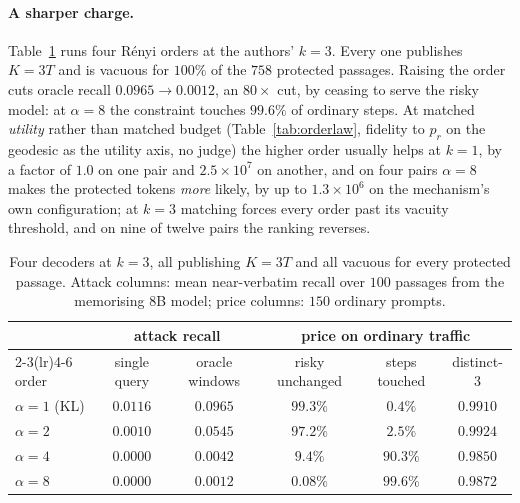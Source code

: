 \paragraph{A sharper charge.}
Table~\ref{tab:orders} runs four R\'enyi orders at the authors' $k=3$. Every one publishes $K=3T$ and is
vacuous for $100\%$ of the $758$ protected passages. Raising the order cuts oracle recall
$0.0965 \to 0.0012$, an $80\times$ cut, by ceasing to serve the risky model: at $\alpha = 8$ the constraint
touches $99.6\%$ of ordinary steps. At matched \emph{utility} rather than matched budget
(Table~\ref{tab:orderlaw}, fidelity to $p_r$ on the geodesic as the utility axis, no judge) the higher order
usually helps at $k=1$, by a factor of $1.0$ on one pair and $2.5\times10^{7}$ on another, and on four pairs
$\alpha{=}8$ makes the protected tokens \emph{more} likely, by up to $1.3\times10^{6}$ on the mechanism's own
configuration; at $k=3$ matching forces every order past its vacuity threshold, and on nine of twelve pairs
the ranking reverses.\label{app:matched}

\begin{table}[h]
\centering\footnotesize
\caption{Four decoders at $k=3$, all publishing $K=3T$ and all vacuous for every protected passage. Attack
columns: mean near-verbatim recall over $100$ passages from the memorising $8$B model; price columns: $150$
ordinary prompts.}
\label{tab:orders}
\setlength{\tabcolsep}{5pt}
\begin{tabular}{@{}lccccc@{}}
\toprule
& \multicolumn{2}{c}{attack recall} & \multicolumn{3}{c}{price on ordinary traffic} \\
\cmidrule(lr){2-3}\cmidrule(lr){4-6}
order & single query & oracle windows & risky unchanged & steps touched & distinct-3 \\
\midrule
$\alpha = 1$ (KL) & $0.0116$ & $0.0965$ & $99.3\%$ & $0.4\%$  & $0.9910$ \\
$\alpha = 2$      & $0.0010$ & $0.0545$ & $97.2\%$ & $2.5\%$  & $0.9924$ \\
$\alpha = 4$      & $0.0000$ & $0.0042$ & $9.4\%$  & $90.3\%$ & $0.9850$ \\
$\alpha = 8$      & $0.0000$ & $0.0012$ & $0.08\%$ & $99.6\%$ & $0.9872$ \\
\bottomrule
\end{tabular}
\end{table}


